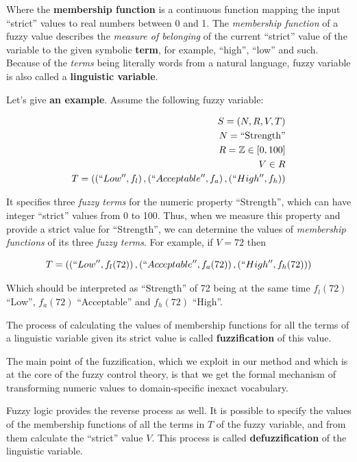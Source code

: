 \documentclass[12pt, a4paper]{report}
\begin{document}
  Where the \textbf{membership function} is a continuous function mapping the input ``strict'' values to real numbers between 0 and 1.
  The \textit{membership function} of a fuzzy value describes the \textit{measure of belonging} of the current ``strict'' value of the variable to the given symbolic \textbf{term},
  for example, ``high'', ``low'' and such.
  Because of the \textit{terms} being literally words from a natural language, fuzzy variable is also called a \textbf{linguistic variable}.

  Let's give \textbf{an example}.
  Assume the following fuzzy variable:

  \begin{eqnarray}
    S = \left(N, R, V, T\right)\\
    N = \textrm{``Strength''}\\
    R = \mathbb{Z} \in [0, 100]\\
    V \in R\\
    T = \left(\left(``Low'', f_l\right), \left(``Acceptable'', f_a\right), \left(``High'', f_h\right)\right)
  \end{eqnarray}

  It specifies three \textit{fuzzy terms} for the numeric property ``Strength'', which can have integer ``strict'' values from 0 to 100.
  Thus, when we measure this property and provide a strict value for ``Strength'', we can determine the values of \textit{membership functions} of its three \textit{fuzzy terms}.
  For example, if $V = 72$ then
  
  \begin{equation}
    T = \left(\left(``Low'', f_l(72) \right), \left(``Acceptable'', f_a(72) \right), \left(``High'', f_h(72)\right)\right)
  \end{equation}
  
  Which should be interpreted as ``Strength'' of 72 being at the same time $f_l(72)$ ``Low'', $f_a(72)$ ``Acceptable'' and $f_h(72)$ ``High''.

  The process of calculating the values of membership functions for all the terms of a linguistic variable given its strict value is called \textbf{fuzzification} of this value.

  The main point of the fuzzification, which we exploit in our method and which is at the core of the fuzzy control theory, is that we get the formal mechanism of transforming numeric values to domain-specific inexact vocabulary.

  Fuzzy logic provides the reverse process as well.
  It is possible to specify the values of the membership functions of all the terms in $T$ of the fuzzy variable, and from them calculate the ``strict'' value $V$.
  This process is called \textbf{defuzzification} of the linguistic variable.
\end{document}
